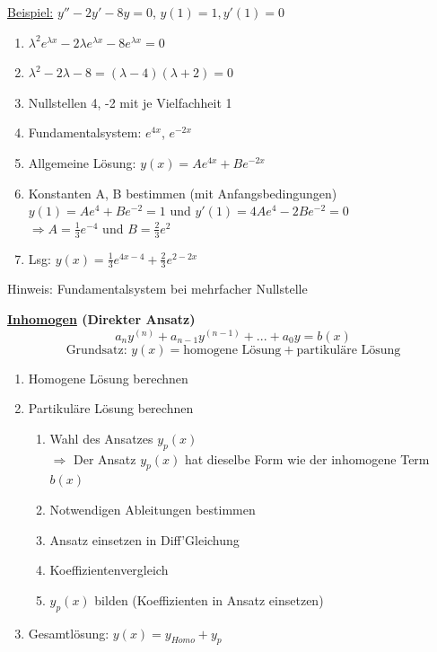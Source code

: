 \documentclass[6pt]{article}
\begin{document}
\begin{multicols*}{3}
		\vspace{3mm}
		\underline{Beispiel:} 	\hspace{5mm}  $y'' - 2y' - 8y = 0$, $y(1)=1, y'(1)=0$\\
		\begin{enumerate}[label=(\roman*), itemsep=2pt, parsep=3pt ]
			\item  $\lambda^2e^{\lambda x} - 2\lambda e^{\lambda x} - 8e^{\lambda x} = 0$
			\item  $\lambda^2 - 2\lambda - 8 = (\lambda - 4)(\lambda + 2) =0$
			\item  Nullstellen 4, -2 mit je Vielfachheit 1
			\item  Fundamentalsystem: $e^{4x}$, $e^{-2x}$
			\item  Allgemeine L{\"o}sung: $y(x) = Ae^{4x} + Be^{-2x}$
			\item  Konstanten A, B bestimmen (mit Anfangsbedingungen) \\
					  $y(1) = Ae^{4} + Be^{-2} = 1$ und $y'(1) = 4Ae^{4} - 2Be^{-2} = 0$ \\
					  $\Rightarrow A=\frac{1}{3}e^{-4}$ und $B=\frac{2}{3}e^2$
			\item Lsg:	\quad $y(x) = \frac{1}{3}e^{4x-4} + \frac{2}{3}e^{2-2x}$
						 
		\end{enumerate}
	
	
	
	Hinweis: Fundamentalsystem bei mehrfacher Nullstelle
	
	
	
	
	\columnbreak
	{\bf \underline{Inhomogen} (Direkter Ansatz)} \\
	
			\[a_{n}y^{(n)} + a_{n-1}y^{(n-1)} + ... + a_{0}y = b(x)\]
			\[ \text{Grundsatz: } y(x) = \text{homogene L{\"o}sung} + \text{partikul{\"a}re L{\"o}sung} \]


			\begin{enumerate}[label=(\roman*), itemsep=2pt, parsep=3pt]
				\item Homogene L{\"o}sung berechnen
				\item Partikul{\"a}re L{\"o}sung berechnen
						\begin{enumerate}[itemsep=1pt, parsep=2pt]
							\item Wahl des Ansatzes $y_p(x)$\\
									$\Rightarrow$ Der Ansatz $y_p(x)$ hat dieselbe Form wie der inhomogene Term $b(x)$ 
							\item Notwendigen Ableitungen bestimmen
							\item Ansatz einsetzen in Diff'Gleichung
							\item Koeffizientenvergleich
							\item $y_p(x)$ bilden (Koeffizienten in Ansatz einsetzen)
					\end{enumerate}
				\item Gesamtl{\"o}sung: $y(x) = y_{Homo} + y_p$		
			\end{enumerate}


\end{multicols*}
\end{document}
